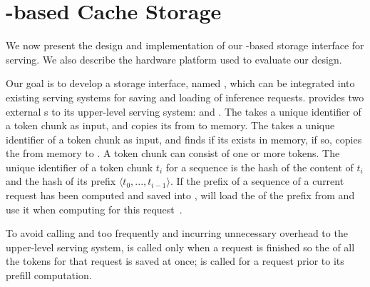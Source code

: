 


\section{\cxl-based \kv Cache Storage}
\label{sec:implementation}


We now present the design and implementation of our \cxl-based \kvcache storage interface for \llm serving. We also describe the hardware platform used to evaluate our design.

 Our goal is to develop a \cxl storage interface, named \tool, which can be integrated into existing \llm serving systems for saving and loading \kvcache of inference requests.
\tool provides two external \api{}s to its upper-level serving system: \apisave and \apiload. 
The \apisave takes a unique identifier of a token chunk as input, and copies its \kvcache from \gpu to \cxl memory. 
The \apiload takes a unique identifier of a token chunk as input, and finds if its  \kvcache exists in \cxl memory, if so, copies the \kvcache from \cxl memory to \gpu. A token chunk can consist of one or more tokens.
The unique identifier of a token chunk $t_i$ for a sequence is the hash of the content of $t_i$ and the hash of its prefix $\langle t_0,...,t_{i-1}\rangle$. If the prefix of a sequence of a current request has been computed and saved into \cxl, \tool will load the \kvcache of the prefix from \cxl and use it when computing for this request~\cite{pagedattenion}. 

To avoid calling \apisave and \apiload too frequently and incurring unnecessary overhead to the upper-level serving system, \apisave is called only when a request is finished so the \kvcache of all the tokens for that request is saved at once; \apiload is called for a request prior to its prefill computation. 

